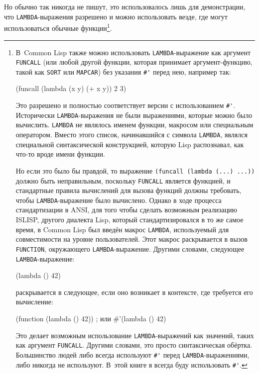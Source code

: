 Но обычно так никогда не пишут, это использовалось лишь для демонстрации, что
\lstinline{LAMBDA}-выражения разрешено и можно использовать везде, где могут использоваться
обычные функции\footnote{В~Common Lisp также можно использовать
\lstinline{LAMBDA}-выражение как аргумент \lstinline{FUNCALL} (или любой другой функции, которая
принимает аргумент-функцию, такой как \lstinline{SORT} или \lstinline{MAPCAR}) без указания
\lstinline!#'! перед нею, например так:

\begin{myverb}
(funcall (lambda (x y) (+ x y)) 2 3)
\end{myverb}

Это разрешено и полностью соответствует версии с использованием \lstinline!#'!.  Исторически
\lstinline{LAMBDA}-выражения не были выражениями, которые можно было вычислить.  \lstinline{LAMBDA}
не являлось именем функции, макросом или специальным оператором.  Вместо этого список,
начинавшийся с символа \lstinline{LAMBDA}, являлся специальной синтаксической конструкцией,
которую Lisp распознавал, как что-то вроде имени функции.

Но если это было бы правдой, то выражение \lstinline{(funcall (lambda (...) ...))} должно быть
неправильным, поскольку \lstinline{FUNCALL} является функцией, и стандартные правила вычислений
для вызова функций должны требовать, чтобы \lstinline{LAMBDA}-выражение было вычислено.
Однако в ходе процесса стандартизации в ANSI, для того чтобы сделать возможным реализацию
ISLISP, другого диалекта Lisp, который стандартизировался в то же самое время, в Common
Lisp был введён макрос \lstinline{LAMBDA}, используемый для совместимости на уровне
пользователей.  Этот макрос раскрывается в вызов \lstinline{FUNCTION}, окружающего
\lstinline{LAMBDA}-выражение.  Другими словами, следующее \lstinline{LAMBDA}-выражение:

\begin{myverb}
(lambda () 42)
\end{myverb}

\noindent{}раскрывается в следующее, если оно возникает в контексте, где требуется его вычисление:

\begin{myverb}
(function (lambda () 42))   ; или #'(lambda () 42)
\end{myverb}

Это делает возможным использование \lstinline{LAMBDA}-выражений как значений, таких как
аргумент \lstinline{FUNCALL}.  Другими словами, это просто синтаксическая обёртка.  Большинство
людей либо всегда используют \lstinline!#'! перед \lstinline{LAMBDA}-выражениями, либо никогда
не используют.  В~этой книге я всегда буду использовать \lstinline!#'!.}\hspace{\footnotenegspace}.

